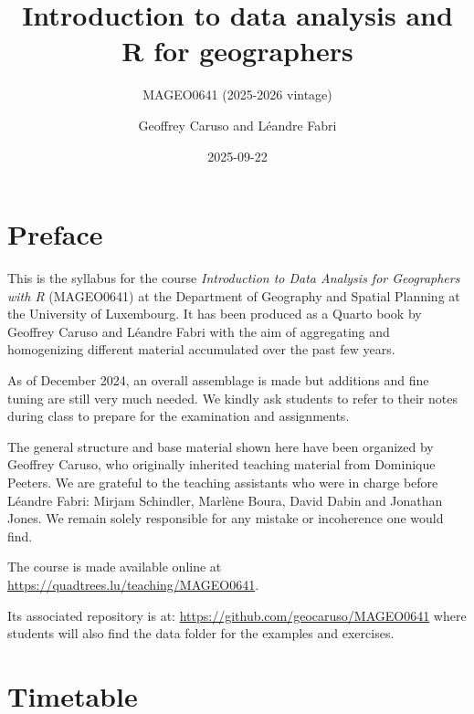 \documentclass[
  letterpaper,
  DIV=11,
  numbers=noendperiod]{scrreprt}
\title{Introduction to data analysis and R for geographers}
\subtitle{MAGEO0641 (2025-2026 vintage)}
\author{Geoffrey Caruso and Léandre Fabri}
\date{2025-09-22}
\renewcommand*\contentsname{Table of contents}
\newcommand\contentsname{Table of contents}
\begin{document}
\maketitle

\renewcommand*\contentsname{Table of contents}
{
\hypersetup{linkcolor=}
\setcounter{tocdepth}{2}
\tableofcontents
}


\chapter*{Preface}\label{sec-preface}


This is the syllabus for the course \emph{Introduction to Data Analysis
for Geographers with R} (MAGEO0641) at the Department of Geography and
Spatial Planning at the University of Luxembourg. It has been produced
as a Quarto book by Geoffrey Caruso and Léandre Fabri with the aim of
aggregating and homogenizing different material accumulated over the
past few years.

As of December 2024, an overall assemblage is made but additions and
fine tuning are still very much needed. We kindly ask students to refer
to their notes during class to prepare for the examination and
assignments.

The general structure and base material shown here have been organized
by Geoffrey Caruso, who originally inherited teaching material from
Dominique Peeters. We are grateful to the teaching assistants who were
in charge before Léandre Fabri: Mirjam Schindler, Marlène Boura, David
Dabin and Jonathan Jones. We remain solely responsible for any mistake
or incoherence one would find.

The course is made available online at
\url{https://quadtrees.lu/teaching/MAGEO0641}.

Its associated repository is at:
\url{https://github.com/geocaruso/MAGEO0641} where students will also
find the data folder for the examples and exercises.


\chapter*{Timetable}\label{sec-timetable}

\end{document}
